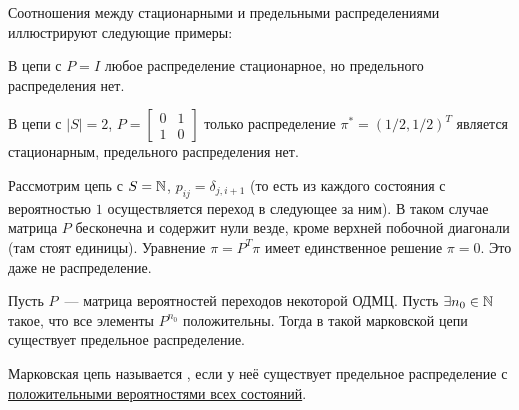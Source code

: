 Соотношения между стационарными и предельными распределениями иллюстрируют следующие примеры:

\begin{example}
    \label{example:markov:stationary_but_not_limit}
    В цепи с $ P = I $ любое распределение стационарное,
    но предельного распределения нет.
\end{example}

\begin{example}
    \label{example:markov:single_stationary_but_not_limit}
    В цепи с $ |S| = 2 $, $ P = \begin{bmatrix} 0 & 1 \\ 1 & 0 \end{bmatrix} $ только распределение
    $ \pi^* = (1/2, 1/2)^T $ является стационарным, предельного распределения нет.
\end{example}

\begin{example}
    \label{example:markov:no_stationary}
    Рассмотрим цепь с $ S = \mathbb{N} $, $ p_{ij} = \delta_{j,i+1} $
    (то есть из каждого состояния с вероятностью $ 1 $ осуществляется переход в следующее за ним).
    В таком случае матрица $ P $ бесконечна и содержит нули везде,
    кроме верхней побочной диагонали (там стоят единицы).
    Уравнение $ \pi = P^T \pi $ имеет единственное решение $ \pi = 0 $.
    Это даже не распределение.
\end{example}

\begin{statement}
    \label{statement:markov:has_limit}
    Пусть $ P $~--- матрица вероятностей переходов некоторой ОДМЦ.
    Пусть $ \exists n_0 \in \mathbb{N} $ такое, что все элементы $ P^{n_0} $ положительны.
    Тогда в такой марковской цепи существует предельное распределение.
\end{statement}

\begin{definition}
    \label{definition:markov:ergodic_chain}
    Марковская цепь называется ,
    если у неё существует предельное распределение с \uline{положительными вероятностями всех состояний}.
\end{definition}

